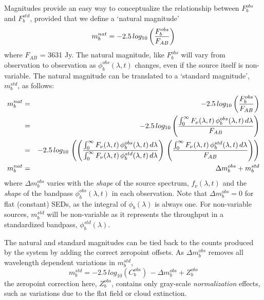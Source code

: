 \documentclass[12pt,preprint]{aastex}
\begin{document}
Magnitudes provide an easy way to conceptualize the relationship
between $F_b^{obs}$ and $F_b^{std}$, provided that we define a
`natural magnitude' 
\begin{equation}
\label{eqn:natmag}
m_b^{nat}  = -2.5\, log_{10} \left( {F_b^{obs} \over F_{AB}}  \right)
\end{equation}
where $F_{AB}$ = 3631 Jy. The natural magnitude, like $F_b^{obs}$ will
vary from observation to observation as $\phi_b^{obs}(\lambda,t)$
changes, even if the source itself is non-variable. The natural
magnitude can be translated to a `standard magnitude', $m_b^{std}$, as
follows:
\begin{eqnarray}
m_b^{nat} & = &-2.5\, log_{10} \left( {F_b^{obs} \over F_{AB}} \right) \\
& = & -2.5 \, log_{10} \left( { \int_0^\infty {F_\nu(\lambda,t) \,
    \phi_b^{obs}(\lambda,t) \, d\lambda} \over F_{AB} }  \right) \\
& = & -2.5 \, log_{10} \, \left( \left( { \int_0^\infty {F_\nu(\lambda,t) \,
    \phi_b^{obs}(\lambda,t) \, d\lambda} \over \int_0^\infty {F_\nu(\lambda,t) \,
    \phi_b^{std}(\lambda,t) \, d\lambda}} \right) \, \left( {\int_0^\infty {F_\nu(\lambda,t) \,
    \phi_b^{std}(\lambda,t) \, d\lambda} \over F_{AB}} \right) \right) \\
m_b^{nat} & = & \Delta m_b^{obs} + m_b^{std} 
\end{eqnarray}
where $\Delta m_b^{obs}$ varies with the {\it shape} of the source
spectrum, $f_\nu(\lambda,t)$ and the {\it shape} of the bandpass
$\phi_b^{obs}(\lambda,t)$ in each observation. Note that $\Delta
m_b^{obs}=0$ for flat (constant) SEDs, as the integral of
$\phi_b(\lambda)$ is always one.  For non-variable sources,
$m_b^{std}$ will be non-variable as it represents the throughput in a
standardized bandpass, $\phi_b^{std}(\lambda)$.

The natural and standard magnitudes can be tied back to the counts
produced by the system by adding the correct zeropoint offsets. As
$\Delta m_b^{obs}$ removes all wavelength dependent variations in $m_b^{std}$,
\begin{equation}
\label{eqn:mag2counts}
m_b^{std} = -2.5\,log_{10}(C_b^{obs}) \, - \Delta m_b^{obs} + Z_b^{obs}
\end{equation}
the zeropoint correction here, $Z_b^{obs}$, contains only gray-scale
{\it normalization} effects, such as variations due to the flat field
or cloud extinction. 
\end{document}
